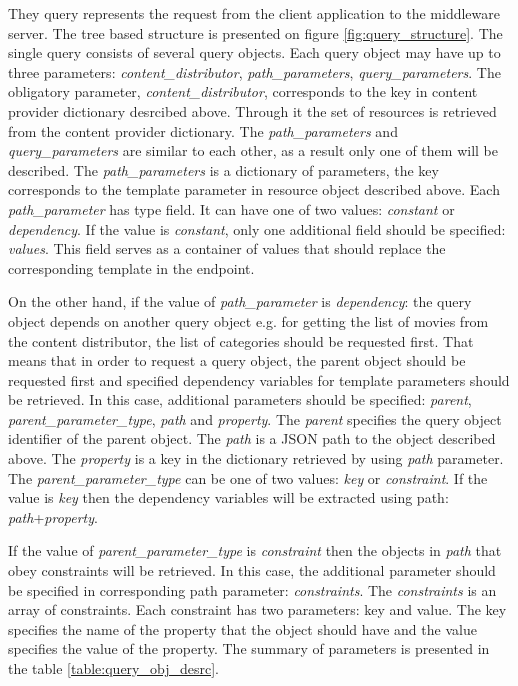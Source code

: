 They query represents the request from the client application to the middleware server. The tree based structure is presented on figure \ref{fig:query_structure}. The single query consists of several query objects.
Each query object may have up to three parameters: \textit{content\_distributor}, \textit{path\_parameters}, \textit{query\_parameters}. The obligatory parameter, \textit{content\_distributor}, corresponds to the key in content provider dictionary desrcibed above. Through it the set of resources is retrieved from the content provider dictionary. The \textit{path\_parameters} and \textit{query\_parameters} are similar to each other, as a result only one of them will be described. The \textit{path\_parameters} is a dictionary of parameters, the key corresponds to the template parameter in resource object described above. Each \textit{path\_parameter} has type field. It can have one of two values: \textit{constant} or \textit{dependency}. If the value is \textit{constant}, only one additional field should be specified: \textit{values}. This field serves as a container of values that should replace the corresponding template in the endpoint. 

On the other hand, if the value of \textit{path\_parameter} is \textit{dependency}: the query object depends on another query object e.g. for getting the list of movies from the content distributor, the list of categories should be requested first. That means that in order to request a query object, the parent object should be requested first and specified dependency variables for template parameters should be retrieved. In this case, additional parameters should be specified: \textit{parent}, \textit{parent\_parameter\_type}, \textit{path} and \textit{property}. The \textit{parent} specifies the query object identifier of the parent object. The \textit{path} is a JSON path to the object described above. The \textit{property} is a key in the dictionary retrieved by using \textit{path} parameter. The \textit{parent\_parameter\_type} can be one of two values: \textit{key} or \textit{constraint}. If the value is \textit{key} then the dependency variables will be extracted using path: \textit{path}+\textit{property}.

If the value of \textit{parent\_parameter\_type} is \textit{constraint} then the objects in \textit{path} that obey constraints will be retrieved. In this case, the additional parameter should be specified in corresponding path parameter: \textit{constraints}. The \textit{constraints} is an array of constraints. Each constraint has two parameters: key and value. The key specifies the name of the property that the object should have and the value specifies the value of the property. The summary of parameters is presented in the table \ref{table:query_obj_desrc}.


